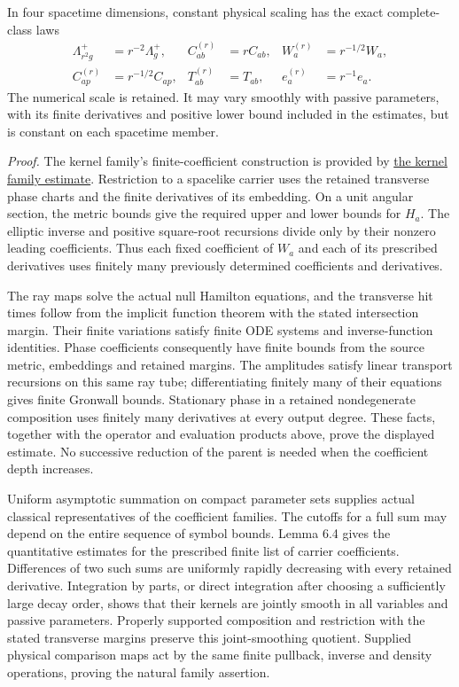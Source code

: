 \documentclass[
  english,
  11pt,
  reqno]{amsart}
\begin{document}
In four spacetime dimensions, constant physical scaling has the exact
complete-class laws%
 \[
\begin{aligned}
\Lambda_{r^2g}^+&=r^{-2}\Lambda_g^+,&
C_{ab}^{(r)}&=rC_{ab},&
W_a^{(r)}&=r^{-1/2}W_a,\\
C_{ap}^{(r)}&=r^{-1/2}C_{ap},&
T_{ab}^{(r)}&=T_{ab},&
e_a^{(r)}&=r^{-1}e_a.
\end{aligned}
\] The numerical scale is retained. It may vary smoothly with passive
parameters, with its finite derivatives and positive lower bound
included in the estimates, but is constant on each spacetime member.

\emph{Proof.} The kernel family's finite-coefficient construction is
provided by \hyperref[prop:online-wave-kernel-finite-families]{the
kernel family estimate}. Restriction to a spacelike carrier uses the
retained transverse phase charts and the finite derivatives of its
embedding. On a unit angular section, the metric bounds give the
required upper and lower bounds for \(H_a\). The elliptic inverse and
positive square-root recursions divide only by their nonzero leading
coefficients. Thus each fixed coefficient of \(W_a\) and each of its
prescribed derivatives uses finitely many previously determined
coefficients and derivatives.

The ray maps solve the actual null Hamilton equations, and the
transverse hit times follow from the implicit function theorem with the
stated intersection margin. Their finite variations satisfy finite ODE
systems and inverse-function identities. Phase coefficients consequently
have finite bounds from the source metric, embeddings and retained
margins. The amplitudes satisfy linear transport recursions on this same
ray tube; differentiating finitely many of their equations gives finite
Gronwall bounds. Stationary phase in a retained nondegenerate
composition uses finitely many derivatives at every output degree. These
facts, together with the operator and evaluation products above, prove
the displayed estimate. No successive reduction of the parent is needed
when the coefficient depth increases.

Uniform asymptotic summation on compact parameter sets supplies actual
classical representatives of the coefficient families. The cutoffs for a
full sum may depend on the entire sequence of symbol bounds. Lemma 6.4
gives the quantitative estimates for the prescribed finite list of
carrier coefficients. Differences of two such sums are uniformly rapidly
decreasing with every retained derivative. Integration by parts, or
direct integration after choosing a sufficiently large decay order,
shows that their kernels are jointly smooth in all variables and passive
parameters. Properly supported composition and restriction with the
stated transverse margins preserve this joint-smoothing quotient.
Supplied physical comparison maps act by the same finite pullback,
inverse and density operations, proving the natural family assertion.
\end{document}
